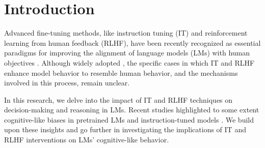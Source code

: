 %

\section{Introduction}



Advanced fine-tuning methods, like instruction tuning (IT) and reinforcement learning from human feedback (RLHF), have been recently recognized as essential paradigms for improving the alignment of language models (LMs) with human objectives \cite{Ouyang2022TrainingLM,bai2022training}.
Although widely adopted \cite{zhou2023comprehensive}, the specific cases in which IT and RLHF enhance model behavior to resemble human behavior, and the mechanisms involved in this process, remain unclear.


In this research, we delve into the impact of IT and RLHF techniques on decision-making and reasoning in LMs.
Recent studies highlighted to some extent cognitive-like biases in pretrained LMs \cite{Binz2022UsingCP, dasgupta2022language} and instruction-tuned models \cite{hagendorff2022machine}.
We build upon these insights and go further in investigating the implications of IT and RLHF interventions on LMs' cognitive-like behavior.

